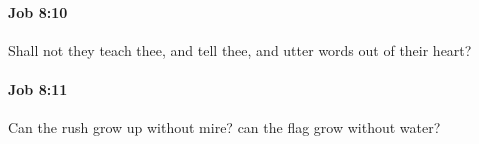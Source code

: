 		\paragraph{Job 8:10} %
			\label{JOB-8-10}

			Shall not they teach thee, and tell thee, and utter words out of their heart?


		\paragraph{Job 8:11} %
			\label{JOB-8-11}

			Can the rush grow up without mire? can the flag grow without water?


